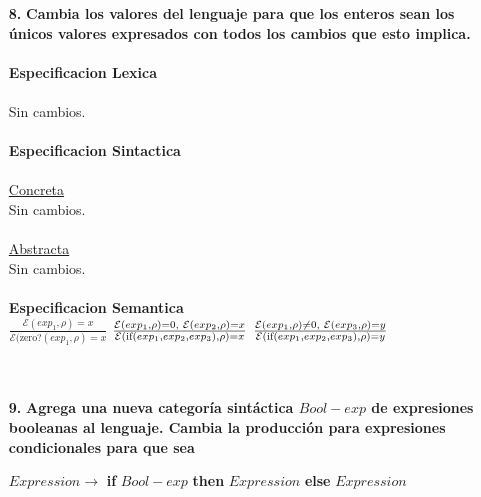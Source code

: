 \documentclass{article}
\begin{document}
\begin{itemize}
    \item[\textbf{8.}] \textbf{{\Large Cambia los valores del lenguaje para que los enteros sean los únicos valores expresados con todos los cambios que esto implica.}}\\
    \\
    \textbf{Especificacion Lexica}\\
    \\
    \hspace*{10mm} Sin cambios.\\
    \\
    \textbf{Especificacion Sintactica}\\
    \\
    \hspace*{10mm} \underline{Concreta}\\
    \hspace*{10mm} Sin cambios.\\
    \\
    \hspace*{10mm} \underline{Abstracta}\\
    \hspace*{10mm} Sin cambios.\\
    \\
    \textbf{Especificacion Semantica}\\
    \hspace*{10mm}
        $\frac
        {\mathcal{E}(exp_1,\rho)=x}
        {\mathcal{E}(\text{zero?}(exp_1,\rho)=x}$
        \hspace*{10mm}
        $\frac
        {\mathcal{E}(exp_1,\rho)=0,\hspace{1mm}\mathcal{E}(exp_2,\rho)=x}
        {\mathcal{E}(\text{if}(exp_1,exp_2,exp_3),\rho)=x}$
        \hspace*{10mm}
        $\frac
        {\mathcal{E}(exp_1,\rho)\neq 0,\hspace{1mm}\mathcal{E}(exp_3,\rho)=y}
        {\mathcal{E}(\text{if}(exp_1,exp_2,exp_3),\rho)=y}$\\
        \\
    \\
    \item[\textbf{9.}] \textbf{{\Large Agrega una nueva categoría sintáctica $Bool-exp$ de expresiones booleanas al lenguaje. Cambia la producción para expresiones condicionales para que sea}}
    \begin{center}
        $Expression\rightarrow$ \textbf{if} $Bool-exp$ \textbf{then} $Expression$ \textbf{else} $Expression$

\end{center}
\end{itemize}
\end{document}
